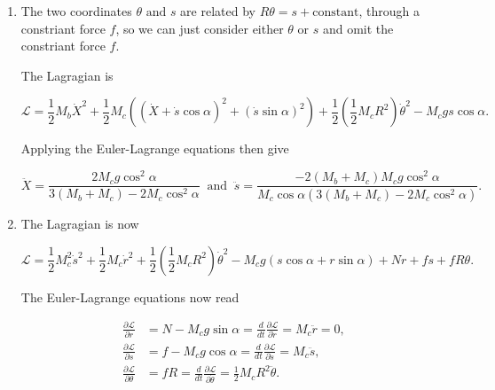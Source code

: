 \documentclass[a4paper,12pt]{report}
\begin{document}
{\begin{enumerate}
	\item The two coordinates \(\theta \text { and } s\) are related by \(R \theta = s + \text{constant} \), through a constriant force \(f\), so we can just consider either \(\theta \text { or } s\) and omit the constriant force \(f\). 
	
	The Lagragian is 

	\begin{equation}
		\mathcal{L} = \frac{1}{2} M_{b}\dot{X} ^2+ \frac{1}{2} M_{c}\left( \left( \dot{X} + \dot{s} \cos \alpha  \right)^2 + (\dot{s} \sin \alpha )^2\right) + \frac{1}{2} \left( \frac{1}{2} M_{c}R^2  \right) \dot{\theta }^2 - M_{c} gs \cos \alpha .  
	\end{equation}

	Applying the Euler-Lagrange equations then give

	\begin{equation}
		\ddot{X} = \frac{2M_{c} g\cos ^2\alpha }{3(M_{b}+M_{c}  )-2M_{c} \cos ^2\alpha } ~\text { and }~ \ddot{s} = \frac{-2(M_{b}+M_{c}  )M_{c}g \cos ^2\alpha }{M_{c} \cos \alpha (3(M_{b}+M_{c}  )-2M_{c}\cos ^2\alpha  )}.  
	\end{equation}
	
	\item The Lagragian is now 
	
	\begin{equation}
		\mathcal{L} = \frac{1}{2} M_{c}^2 \dot{s}^2  + \frac{1}{2} M_{c}\dot{r} ^2  + \frac{1}{2} \left( \frac{1}{2}M_{c}R^2   \right) \dot{\theta }^2 - M_{c}g(s \cos \alpha +r\sin \alpha )+ Nr+fs+fR \theta .  
	\end{equation}
	
	The Euler-Lagrange equations now read

	\begin{equation}
		\begin{aligned} 
			\frac{\partial \mathcal{L}}{\partial r} &= N-M_{c}g\sin \alpha = \frac{d}{dt} \frac{\partial \mathcal{L}}{\partial \dot{r} } = M_{c}\ddot{r} = 0 ,\\
			\frac{\partial \mathcal{L}}{\partial s} &= f-M_{c} g\cos \alpha = \frac{d}{dt} \frac{\partial \mathcal{L}}{\partial \dot{s} } = M_{c} \ddot{s},\\
			\frac{\partial \mathcal{L}}{\partial \theta } &= fR  = \frac{d}{dt} \frac{\partial \mathcal{L}}{\partial \dot{\theta } } = \frac{1}{2} M_{c}R^2 \ddot{\theta }.   
			\end{aligned} 
	\end{equation}
	

\end{enumerate}}
\end{document}
